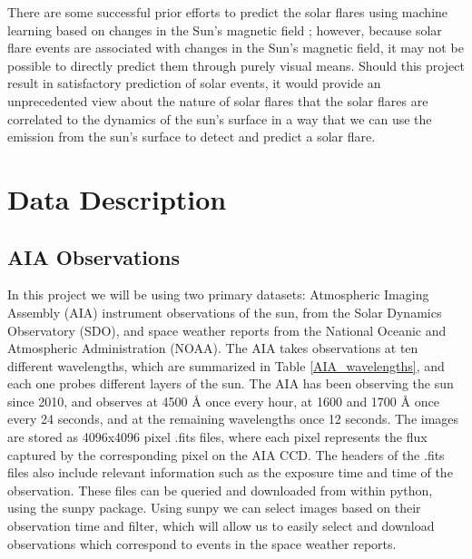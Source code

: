 \documentclass[12pt, letterpaper]{article}
\begin{document}
There are some successful prior efforts to predict the solar flares using machine learning based on changes in the Sun’s magnetic field \cite{Raboonik2016}; however, because solar flare events are associated with changes in the Sun’s magnetic field, it may not be possible to directly predict them through purely visual means. Should this project result in satisfactory prediction of solar events, it would provide an unprecedented view about the nature of solar flares that the solar flares are correlated to the dynamics of the sun's surface in a way that we can use the emission from the sun's surface to detect and predict a solar flare.


\section*{Data Description}

\subsection*{AIA Observations}

In this project we will be using two primary datasets: Atmospheric Imaging Assembly (AIA) instrument observations of the sun, from the Solar Dynamics Observatory (SDO), and space weather reports from the National Oceanic and Atmospheric Administration (NOAA).
The AIA takes observations at ten different wavelengths, which are summarized in Table \ref{AIA_wavelengths}, and each one probes different layers of the sun. The AIA has been observing the sun since 2010, and observes at 4500 Å once every hour, at 1600 and 1700 Å once every 24 seconds, and at the remaining wavelengths once 12 seconds. The images are stored as 4096x4096 pixel .fits files, where each pixel represents the flux captured by the corresponding pixel on the AIA CCD. The headers of the .fits files also include relevant information such as the exposure time and time of the observation. These files can be queried and downloaded from within python, using the sunpy package. Using sunpy we can select images based on their observation time and filter, which will allow us to easily select and download observations which correspond to events in the space weather reports. 
\end{document}
